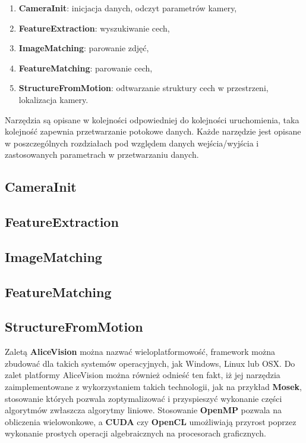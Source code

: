 \begin{enumerate}
   \item \textbf{CameraInit}: inicjacja danych, odczyt parametrów kamery,
   \item \textbf{FeatureExtraction}: wyszukiwanie cech,
   \item \textbf{ImageMatching}: parowanie zdjęć,
   \item \textbf{FeatureMatching}: parowanie cech,
   \item \textbf{StructureFromMotion}: odtwarzanie struktury cech w przestrzeni, lokalizacja kamery.
\end{enumerate}

Narzędzia są opisane w kolejności odpowiedniej do kolejności uruchomienia, taka kolejność zapewnia przetwarzanie potokowe danych.
Każde narzędzie jest opisane w poszczególnych rozdziałach pod względem danych wejścia/wyjścia i zastosowanych parametrach w przetwarzaniu danych.

\subsection{CameraInit}
\subsection{FeatureExtraction}
\subsection{ImageMatching}
\subsection{FeatureMatching}
\subsection{StructureFromMotion}

Zaletą \textbf{AliceVision} można nazwać wieloplatformowość, framework można zbudować dla takich systemów operacyjnych, jak Windows, Linux lub OSX.
Do zalet platformy AliceVision można również odnieść ten fakt, iż jej narzędzia zaimplementowane z wykorzystaniem takich technologii, jak na przykład \textbf{Mosek}, stosowanie których pozwala zoptymalizować i przyspieszyć wykonanie części algorytmów zwłaszcza algorytmy liniowe.
Stosowanie \textbf{OpenMP} pozwala na obliczenia wielowonkowe, a \textbf{CUDA} czy \textbf{OpenCL} umożliwiają przyrost poprzez wykonanie prostych operacji algebraicznych na procesorach graficznych.

